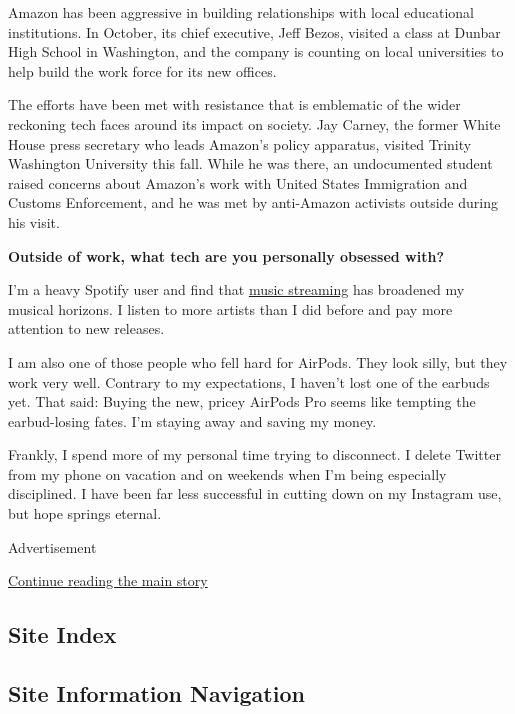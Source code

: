 Amazon has been aggressive in building relationships with local
educational institutions. In October, its chief executive, Jeff Bezos,
visited a class at Dunbar High School in Washington, and the company is
counting on local universities to help build the work force for its new
offices.

The efforts have been met with resistance that is emblematic of the
wider reckoning tech faces around its impact on society. Jay Carney, the
former White House press secretary who leads Amazon's policy apparatus,
visited Trinity Washington University this fall. While he was there, an
undocumented student raised concerns about Amazon's work with United
States Immigration and Customs Enforcement, and he was met by
anti-Amazon activists outside during his visit.

\textbf{Outside of work, what tech are you personally obsessed with?}

I'm a heavy Spotify user and find that
\href{https://www.nytimes3xbfgragh.onion/2015/06/04/technology/personaltech/spotify-sees-a-future-where-music-genres-dont-really-matter.html}{music
streaming} has broadened my musical horizons. I listen to more artists
than I did before and pay more attention to new releases.

I am also one of those people who fell hard for AirPods. They look
silly, but they work very well. Contrary to my expectations, I haven't
lost one of the earbuds yet. That said: Buying the new, pricey AirPods
Pro seems like tempting the earbud-losing fates. I'm staying away and
saving my money.

Frankly, I spend more of my personal time trying to disconnect. I delete
Twitter from my phone on vacation and on weekends when I'm being
especially disciplined. I have been far less successful in cutting down
on my Instagram use, but hope springs eternal.

Advertisement

\protect\hyperlink{after-bottom}{Continue reading the main story}

\hypertarget{site-index}{%
\subsection{Site Index}\label{site-index}}

\hypertarget{site-information-navigation}{%
\subsection{Site Information
Navigation}\label{site-information-navigation}}

